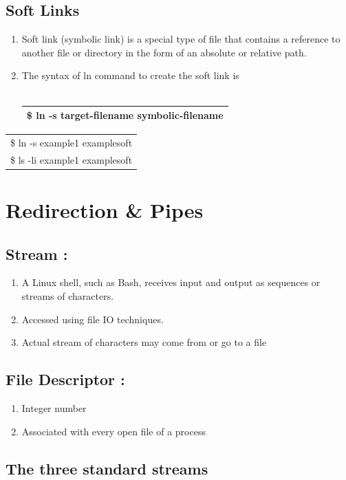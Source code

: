 \documentclass[12pt, a4paper]{report}
\begin{document}
\section{Soft Links}
\begin{enumerate}
\item Soft link (symbolic link) is a special type of file that contains a reference to another file or directory in the form of an absolute or relative path.
\item The syntax of ln command to create the soft link is\\
\\ 
\begin{tabular}{|l|}\hline
\$ ln -s target-filename symbolic-filename\\ \hline
\end{tabular}
\end{enumerate}
\begin{tabular}{|l|}\hline
\$ ln -s example1 examplesoft\\
\$ ls -li example1 examplesoft\\ \hline
\end{tabular}
%
\chapter{Redirection \& Pipes}
\section{Stream :}
\begin{enumerate}
\item A Linux shell, such as Bash, receives input and output as sequences or streams of characters.
\item Accessed using file IO techniques.
\item Actual stream of characters may come from or go to a file
\end{enumerate}
\section{File Descriptor :}
\begin{enumerate}
\item Integer number
\item Associated with every open file of a process
\end{enumerate}
\section{The three standard streams}
\end{document}
